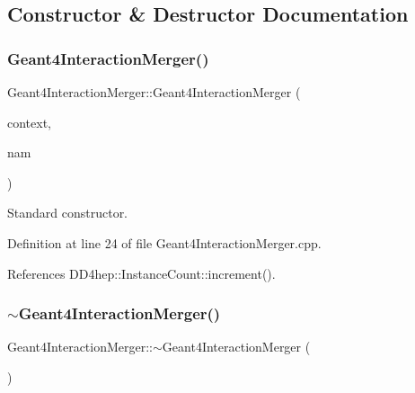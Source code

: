 \subsection{Constructor \& Destructor Documentation}
\hypertarget{class_d_d4hep_1_1_simulation_1_1_geant4_interaction_merger_ad80869d9440400a2d4936649441aa0aa}{}\label{class_d_d4hep_1_1_simulation_1_1_geant4_interaction_merger_ad80869d9440400a2d4936649441aa0aa} 
\subsubsection{\texorpdfstring{Geant4\+Interaction\+Merger()}{Geant4InteractionMerger()}}
{\footnotesize\ttfamily Geant4\+Interaction\+Merger\+::\+Geant4\+Interaction\+Merger (\begin{DoxyParamCaption}\item[{\hyperlink{class_d_d4hep_1_1_simulation_1_1_geant4_context}{Geant4\+Context} $\ast$}]{context,  }\item[{const std\+::string \&}]{nam }\end{DoxyParamCaption})}



Standard constructor. 



Definition at line 24 of file Geant4\+Interaction\+Merger.\+cpp.



References D\+D4hep\+::\+Instance\+Count\+::increment().

\hypertarget{class_d_d4hep_1_1_simulation_1_1_geant4_interaction_merger_a2ef1b19a45945a77332eb85f2fe2d8bf}{}\label{class_d_d4hep_1_1_simulation_1_1_geant4_interaction_merger_a2ef1b19a45945a77332eb85f2fe2d8bf} 
\subsubsection{\texorpdfstring{$\sim$\+Geant4\+Interaction\+Merger()}{~Geant4InteractionMerger()}}
{\footnotesize\ttfamily Geant4\+Interaction\+Merger\+::$\sim$\+Geant4\+Interaction\+Merger (\begin{DoxyParamCaption}{ }\end{DoxyParamCaption})\hspace{0.3cm}{\ttfamily [virtual]}}



